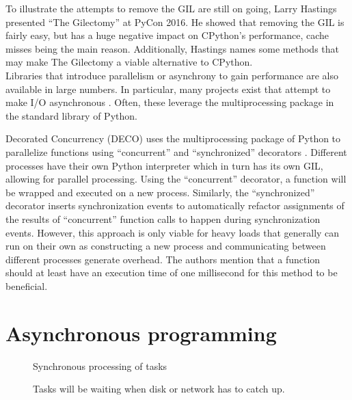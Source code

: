 To illustrate the attempts to remove the GIL are still on going, Larry Hastings presented \enquote{The Gilectomy} at PyCon 2016.
He showed that removing the GIL is fairly easy, but has a huge negative impact on CPython's performance, cache misses being the main reason.
Additionally, Hastings names some methods that may make The Gilectomy a viable alternative to CPython.\\

Libraries that introduce parallelism or asynchrony to gain performance are also available in large numbers.
In particular, many projects exist that attempt to make I/O asynchronous \cite{asyncio2016python}.
Often, these leverage the multiprocessing package in the standard library of Python.

Decorated Concurrency (DECO) uses the multiprocessing package of Python to parallelize functions using  \enquote{concurrent} and \enquote{synchronized} decorators \cite{sherman2016deco}.
Different processes have their own Python interpreter which in turn has its own GIL, allowing for parallel processing.
Using the \enquote{concurrent} decorator, a function will be wrapped and executed on a new process.
Similarly, the \enquote{synchronized} decorator  inserts synchronization events to automatically refactor assignments of the results of \enquote{concurrent} function calls to happen during synchronization events.
However, this approach is only viable for heavy loads that generally can run on their own as constructing a new process and communicating between different processes generate overhead.
The authors mention that a function should at least have an execution time of one millisecond for this method to be beneficial.

\section{Asynchronous programming}

\begin{figure}[!h]
	\caption{Synchronous processing of tasks}
	\label{fig:normal_execution_flow}
\end{figure}

\begin{figure}[h]
	\caption{Tasks will be waiting when disk or network has to catch up.}
	\label{fig:delays_in_execution}
\end{figure}

